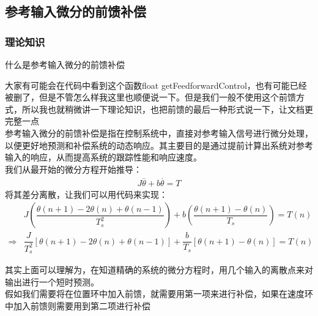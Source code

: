 \documentclass[UTF8,a4paper,12pt]{ctexart}
\begin{document}
        \subsection{参考输入微分的前馈补偿}
        \subsubsection{理论知识}
        \begin{titlebox}{什么是参考输入微分的前馈补偿}
          {
             \hspace{1cm} 大家有可能会在代码中看到这个函数float getFeedforwardControl，也有可能已经被删了，但是不管怎么样我这里也顺便说一下。但是我们一般不使用这个前馈方式，所以我也就稍微讲一下理论知识，也把前馈的最后一种形式说一下，让文档更完整一点  \\ 
            \hspace{1cm}  参考输入微分的前馈补偿是指在控制系统中，直接对参考输入信号进行微分处理，以便更好地预测和补偿系统的动态响应。其主要目的是通过提前计算出系统对参考输入的响应，从而提高系统的跟踪性能和响应速度。\\
            我们从最开始的微分方程开始推导：\\
            \begin{align*}
              J\overset{..}{\theta}+b\overset{.}{\theta}=T
           \end{align*}
            将其差分离散，让我们可以用代码来实现：
          \begin{align*}
              &J\left(\dfrac{\theta(n+1)-2\theta(n)+\theta(n-1)}{T_s^2}\right)+b\left(\dfrac{\theta(n+1)-\theta(n)}{T_s}\right)=T(n) \\
              \Rightarrow&\dfrac{J}{T_s^2}[\theta(n+1)-2\theta(n)+\theta(n-1)]+\dfrac{b}{T_s}[\theta(n+1)-\theta(n)]=T(n)
            \end{align*} 

            其实上面可以理解为，在知道精确的系统的微分方程时，用几个输入的离散点来对输出进行一个短时预测。\\
            假如我们需要将在位置环中加入前馈，就需要用第一项来进行补偿，如果在速度环中加入前馈则需要用到第二项进行补偿\\
          
}
\end{titlebox}
\end{document}
